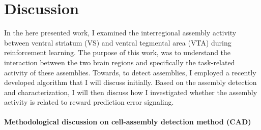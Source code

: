 \chapter{Discussion}
\label{chap:Conclusion}
In the here presented work, I examined the interregional assembly activity between ventral striatum (VS) and ventral tegmental area (VTA) during reinforcement learning. The purpose of this work, was to understand the interaction between the two brain regions and specifically the task-related activity of these assemblies. Towards, to detect assemblies, I employed a recently developed algorithm that I will discuss initially. Based on the assembly detection and characterization, I will then discuss how I investigated whether the assembly activity is related to reward prediction error signaling.
\subsubsection{Methodological discussion on cell-assembly detection method (CAD)}
